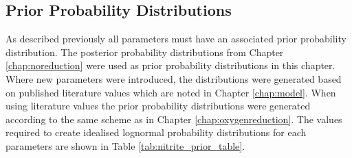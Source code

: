 \subsection{Prior Probability Distributions}

As described previously all parameters must have an associated prior probability distribution. The posterior probability distributions from Chapter \ref{chap:noreduction} were used as prior probability distributions in this chapter. Where new parameters were introduced, the distributions were generated based on published literature values which are noted in Chapter \ref{chap:model}. When using literature values the prior probability distributions were generated according to the same scheme as in Chapter \ref{chap:oxygenreduction}. The values required to create idealised lognormal probability distributions for each parameters are shown in Table \ref{tab:nitrite_prior_table}.

